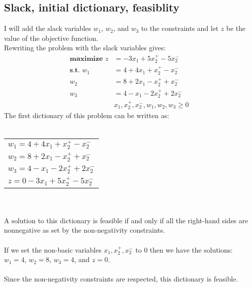 \documentclass[12pt]{article}
\begin{document}
\subsection*{Slack, initial dictionary, feasiblity}
I will add the slack variables $w_{1}$, $w_{2}$, and $w_{3}$ to the constraints and let $z$ be the value of the objective function.\\
Rewriting the problem with the slack variables gives:
\begin{align*}
  \textbf{maximize } z &= -3x_{1} + 5x^{+}_{2} - 5x^{-}_{2}\\
  \textbf{s.t. }     w_{1} &= 4 + 4x_{1} + x^{+}_{2} - x^{-}_{2}\\
                     w_{2} &= 8 + 2x_{1} - x^{+}_{2} + x^{-}_{2}\\
                     w_{3} &= 4 - x_{1} - 2x^{+}_{2} + 2x^{-}_{2}\\
                     &x_{1}, x^{+}_{2}, x^{-}_{2}, w_{1}, w_{2}, w_{3} \geq 0
\end{align*}
The first dictionary of this problem can be written as:\\
\\
\begin{tabular}{l}
  $w_{1} = 4 + 4x_{1} + x^{+}_{2} - x^{-}_{2}$\\
  $w_{2} = 8 + 2x_{1} - x^{+}_{2} + x^{-}_{2}$\\
  $w_{3} = 4 - x_{1} - 2x^{+}_{2} + 2x^{-}_{2}$\\
  \hline
  $z = 0 - 3x_{1} + 5x^{+}_{2} - 5x^{-}_{2}$\\
\end{tabular}
\\
\\
A solution to this dictionary is feasible if and only if all the right-hand sides are nonnegative as set by the non-negativity constraints.\\
\\
If we set the non-basic variables $x_{1}, x^{+}_{2}, x^{-}_{2}$ to 0 then we have the solutions: $w_{1} = 4$, $w_{2} = 8$, $w_{3} = 4$, and $z = 0$.\\
\\
Since the non-negativity constraints are respected, this dictionary is feasible.
\end{document}
